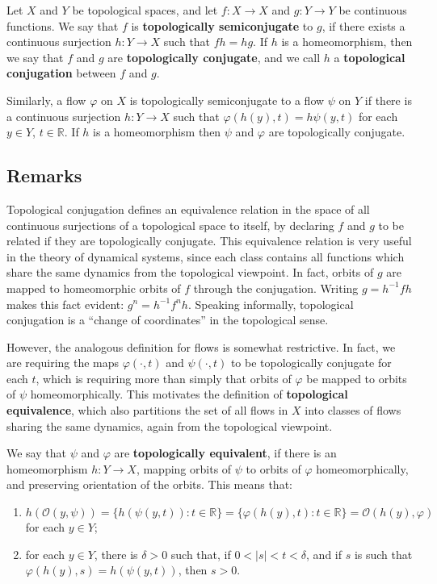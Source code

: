 \documentclass[12pt]{article}
\newcommand{\R}{\mathbb{R}}
\renewcommand{\emph}[1]{\textbf{#1}}
\begin{document}
Let $X$ and $Y$ be topological spaces, and let $f\colon X\to X$ and $g\colon Y\to Y$
be continuous functions. We say that $f$ is
\emph{topologically semiconjugate} to $g$, if there exists a continuous
surjection $h\colon Y\to X$ such that $fh=hg$. If $h$ is a homeomorphism,
then we say that $f$ and $g$ are \emph{topologically conjugate}, and we call
$h$ a \emph{topological conjugation} between $f$ and $g$.

Similarly, a flow $\varphi$ on $X$ is topologically semiconjugate to a flow $\psi$ on $Y$ if there is a continuous surjection $h\colon Y\to X$ such that 
$\varphi(h(y),t) = h\psi(y,t)$ for each $y\in Y$, $t\in \R$. If $h$ is a homeomorphism then $\psi$ and $\varphi$ are topologically conjugate.


\subsection{Remarks}

Topological conjugation defines an equivalence relation in the 
space of all continuous surjections of a topological space to itself, 
by declaring $f$ and $g$ to be related if they are topologically 
conjugate. This equivalence relation is very useful in the theory of
dynamical systems, since each class contains all functions which 
share the same dynamics from the topological viewpoint. In fact, orbits 
of $g$ are mapped to homeomorphic orbits of $f$ through the conjugation.
Writing $g = h^{-1}fh$ makes this fact evident: $g^n = h^{-1}f^nh$.
Speaking informally, topological conjugation is a ``change of coordinates'' in the topological sense.

However, the analogous definition for flows is somewhat restrictive. In fact, we are requiring the maps $\varphi(\cdot,t)$ and $\psi(\cdot,t)$ to be topologically conjugate for each $t$, which is requiring more than simply that  orbits of $\varphi$ be mapped to orbits of $\psi$ homeomorphically.
This motivates the definition of \emph{topological equivalence}, which also partitions the set of all flows in $X$ into classes of flows sharing the same dynamics, again from the topological viewpoint.

We say that $\psi$ and $\varphi$ are \emph{topologically equivalent}, if there is an homeomorphism $h:Y\to X$, mapping orbits of $\psi$ to orbits of $\varphi$ homeomorphically, and preserving orientation of the orbits. This means that:
\begin{enumerate}
\item $h(\mathcal{O}(y,\psi)) = \{h(\psi(y,t)): t\in\R\} = \{\varphi(h(y),t):t\in\R\}= \mathcal{O}(h(y),\varphi)$ for each $y\in Y$;
\item for each $y\in Y$, there is $\delta>0$ such that, if $0<|s|< t < \delta$, and if $s$ is such that $\varphi(h(y),s) = h(\psi(y,t))$, then $s>0$.
\end{enumerate}
\end{document}
